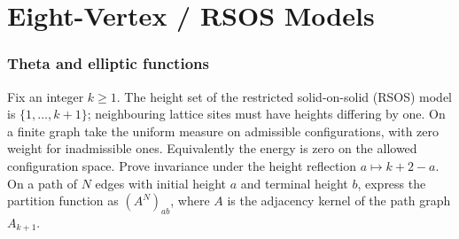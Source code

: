 \part{Eight-Vertex / RSOS Models}

\section{Theta and elliptic functions}

\begin{exercise}
Fix an integer $k\ge1$. The height set of the restricted solid-on-solid
(RSOS) model is $\{1,\dots,k+1\}$; neighbouring lattice sites must
have heights differing by one. On a finite graph take the uniform
measure on admissible configurations, with zero weight for
inadmissible ones. Equivalently the energy is zero on the allowed
configuration space.
Prove invariance under the height reflection $a\mapsto k+2-a$.
On a path of $N$ edges with initial height $a$ and terminal height
$b$, express the partition function as $(A^N)_{ab}$, where $A$
is the adjacency kernel of the path graph $A_{k+1}$.
\end{exercise}

